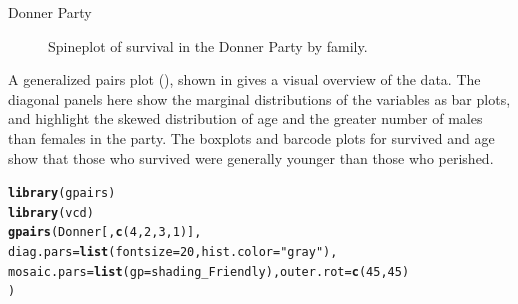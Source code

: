 \documentclass[11pt]{book}\usepackage[]{graphicx}\usepackage[]{color}
\makeatletter
\newcommand{\hlnum}[1]{\textcolor[rgb]{0.686,0.059,0.569}{#1}}%
\newcommand{\hlstr}[1]{\textcolor[rgb]{0.192,0.494,0.8}{#1}}%
\newcommand{\hlstd}[1]{\textcolor[rgb]{0.345,0.345,0.345}{#1}}%
\newcommand{\hlkwc}[1]{\textcolor[rgb]{0.333,0.667,0.333}{#1}}%
\newcommand{\hlkwd}[1]{\textcolor[rgb]{0.737,0.353,0.396}{\textbf{#1}}}%
\newenvironment{kframe}{%
 \def\at@end@of@kframe{}%
 \ifinner\ifhmode%
  \def\at@end@of@kframe{\end{minipage}}%
  \begin{minipage}{\columnwidth}%
 \fi\fi%
 \def\FrameCommand##1{\hskip\@totalleftmargin \hskip-\fboxsep
 \colorbox{shadecolor}{##1}\hskip-\fboxsep
     \hskip-\linewidth \hskip-\@totalleftmargin \hskip\columnwidth}%
 \MakeFramed {\advance\hsize-\width
   \@totalleftmargin\z@ \linewidth\hsize
   \@setminipage}}%
 {\par\unskip\endMakeFramed%
 \at@end@of@kframe}
\newenvironment{knitrout}{}{} %
\renewenvironment{knitrout}{\small\renewcommand{\baselinestretch}{.85}}{} %
\makeatother
\begin{document}
\begin{Example}[donner1]{Donner Party}
\begin{knitrout}
\begin{figure}[!htbp]
\caption[Spineplot of survival in the Donner Party by family]{Spineplot of survival in the Donner Party by family.\label{fig:donner1-spineplot}}
\end{figure}


\end{knitrout}


% 
% 

A generalized pairs plot (), shown in  gives a visual
overview of the data.  The diagonal panels here show the marginal distributions of the variables
as bar plots, and highlight the skewed distribution of age and the greater number of males
than females in the party.  The boxplots and barcode plots for survived and age show
that those who survived were generally younger than those who perished.
\begin{knitrout}
\color{fgcolor}\begin{kframe}
\begin{alltt}
\hlkwd{library}\hlstd{(gpairs)}
\hlkwd{library}\hlstd{(vcd)}
\hlkwd{gpairs}\hlstd{(Donner[,}\hlkwd{c}\hlstd{(}\hlnum{4}\hlstd{,}\hlnum{2}\hlstd{,}\hlnum{3}\hlstd{,}\hlnum{1}\hlstd{)],}
  \hlkwc{diag.pars}\hlstd{=}\hlkwd{list}\hlstd{(}\hlkwc{fontsize}\hlstd{=}\hlnum{20}\hlstd{,} \hlkwc{hist.color}\hlstd{=}\hlstr{"gray"}\hlstd{),}
        \hlkwc{mosaic.pars}\hlstd{=}\hlkwd{list}\hlstd{(}\hlkwc{gp}\hlstd{=shading_Friendly),} \hlkwc{outer.rot}\hlstd{=}\hlkwd{c}\hlstd{(}\hlnum{45}\hlstd{,}\hlnum{45}\hlstd{)}
        \hlstd{)}
\end{alltt}
\end{kframe}\begin{figure}[!htbp]



\end{figure}
\end{knitrout}
\end{Example}
\end{document}
